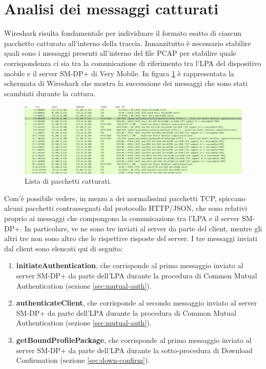 \documentclass[10pt, oneside]{book}
\begin{document}
\section{Analisi dei messaggi catturati}
Wireshark risulta fondamentale per individuare il formato esatto di ciascun pacchetto catturato all'interno della traccia. Innanzitutto è necessario stabilire quali sono i messaggi presenti all'interno del file PCAP per stabilire quale corrispondenza ci sia tra la comunicazione di riferimento tra l'LPA del dispositivo mobile e il server SM-DP+ di Very Mobile. In figura \ref{fig:all-msgs-pcap} è rappresentata la schermata di Wireshark che mostra la successione dei messaggi che sono stati scambiati durante la cattura.\\
\begin{figure}
\includegraphics[width=\linewidth]{all-msgs-pcap.png}
\caption{Lista di pacchetti catturati.}
\label{fig:all-msgs-pcap}
\end{figure}
Com'è possibile vedere, in mezzo a dei normalissimi pacchetti TCP, spiccano alcuni pacchetti contrassegnati dal protocollo HTTP/JSON, che sono relativi proprio ai messaggi che compongono la comunicazione tra l'LPA e il server SM-DP+. In particolare, ve ne sono tre inviati al server da parte del client, mentre gli altri tre non sono altro che le rispettive risposte del server. I tre messaggi inviati dal client sono elencati qui di seguito:
\begin{enumerate}
\item \textbf{initiateAuthentication}, che corrisponde al primo messaggio inviato al server SM-DP+ da parte dell'LPA durante la procedura di Common Mutual Authentication (sezione \ref{sec:mutual-auth}).
\item \textbf{authenticateClient}, che corrisponde al secondo messaggio inviato al server SM-DP+ da parte dell'LPA durante la procedura di Common Mutual Authentication (sezione \ref{sec:mutual-auth}).
\item \textbf{getBoundProfilePackage}, che corrisponde al primo messaggio inviato al server SM-DP+ da parte dell'LPA durante la sotto-procedura di Download Confirmation (sezione \ref{sec:down-confirm}).
\end{enumerate}
\end{document}
